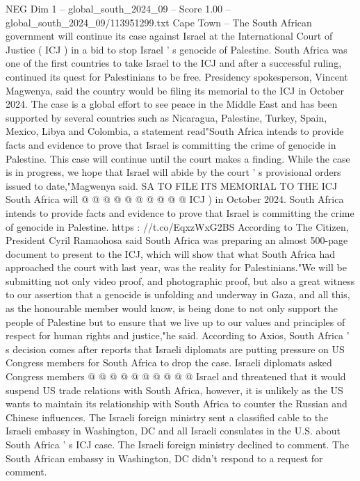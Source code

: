 \begin{textsample}{NEG Dim 1 – global\_south\_2024\_09 – Score 1.00 – global\_south\_2024\_09/113951299.txt}  \label{ex:f1_neg_247}
Cape Town -- The South African government will continue its case against Israel at the International Court of Justice ( ICJ ) in a bid to stop Israel ' s genocide of Palestine.
South Africa was one of the first countries to take Israel to the ICJ and after a successful ruling, continued its quest for Palestinians to be free.
Presidency spokesperson, Vincent Magwenya, said the country would be filing its memorial to the ICJ in October 2024.
The case is a global effort to see peace in the Middle East and has been supported by several countries such as Nicaragua, Palestine, Turkey, Spain, Mexico, Libya and Colombia, a statement read"South Africa intends to provide facts and evidence to prove that Israel is committing the crime of genocide in Palestine.
This case will continue until the court makes a finding.
While the case is in progress, we hope that Israel will abide by the court ' s provisional orders issued to date,"Magwenya said.
SA TO FILE ITS MEMORIAL TO THE ICJ South Africa will @ @ @ @ @ @ @ @ @ @ ICJ ) in October 2024.
South Africa intends to provide facts and evidence to prove that Israel is committing the crime of genocide in Palestine. https : //t.co/EqxzWxG2BS According to The Citizen, President Cyril Ramaohosa said South Africa was preparing an almost 500-page document to present to the ICJ, which will show that what South Africa had approached the court with last year, was the reality for Palestinians."We will be submitting not only video proof, and photographic proof, but also a great witness to our assertion that a genocide is unfolding and underway in Gaza, and all this, as the honourable member would know, is being done to not only support the people of Palestine but to ensure that we live up to our values and principles of respect for human rights and justice,"he said.
According to Axios, South Africa ' s decision comes after reports that Israeli diplomats are putting pressure on US Congress members for South Africa to drop the case.
Israeli diplomats asked Congress members @ @ @ @ @ @ @ @ @ @ Israel and threatened that it would suspend US trade relations with South Africa, however, it is unlikely as the US wants to maintain its relationship with South Africa to counter the Russian and Chinese influences.
The Israeli foreign ministry sent a classified cable to the Israeli embassy in Washington, DC and all Israeli consulates in the U.S. about South Africa ' s ICJ case.
The Israeli foreign ministry declined to comment.
The South African embassy in Washington, DC didn't respond to a request for comment.

\end{textsample}
